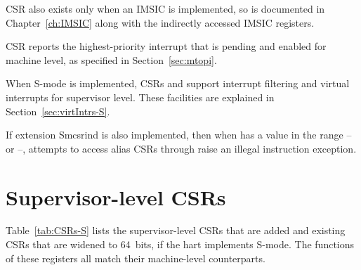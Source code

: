 CSR  also exists only when an IMSIC is implemented,
so is documented in Chapter~\ref{ch:IMSIC}
along with the indirectly accessed IMSIC registers.

CSR  reports the highest-priority interrupt that is pending
and enabled for machine level, as specified in Section~\ref{sec:mtopi}.

When \mbox{S-mode} is implemented, CSRs  and 
support interrupt
filtering and virtual interrupts for supervisor level.
These facilities are explained in Section~\ref{sec:virtIntrs-S}.

If extension Smcsrind is also implemented, then when 
has a value in the range -- or --,
attempts to access alias CSRs  through 
raise an illegal instruction exception.

\section{Supervisor-level CSRs}

Table~\ref{tab:CSRs-S} lists the supervisor-level CSRs that are added
and existing CSRs that are widened to 64~bits,
if the hart implements \mbox{S-mode}.
The functions of these registers all match their machine-level
counterparts.

